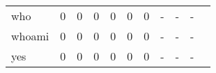 \begin{longtable}{lp{1.20cm}p{1.20cm}p{1.20cm}p{1.20cm}p{1.20cm}p{1.20cm}p{1.20cm}p{1.20cm}p{1.20cm}p{1.20cm}}
who       &                                     0 &                                                  0 &                                                  0 &                                                  0 &                                                  0 &                                                  0 &                                             - &                                                  - &                                                  - \\
whoami    &                                     0 &                                                  0 &                                                  0 &                                                  0 &                                                  0 &                                                  0 &                                             - &                                                  - &                                                  - \\
yes       &                                     0 &                                                  0 &                                                  0 &                                                  0 &                                                  0 &                                                  0 &                                             - &                                                  - &                                                  - \\
\end{longtable}
